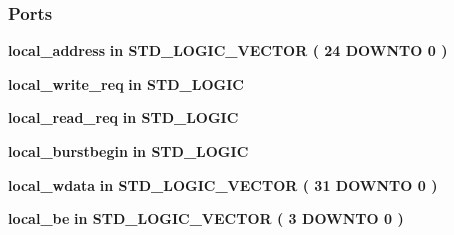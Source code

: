 \subsubsection*{Ports}
 \begin{DoxyCompactItemize}
\item 
{\bf local\+\_\+address}  {\bfseries {\bfseries \textcolor{keywordflow}{in}\textcolor{vhdlchar}{ }}} {\bfseries \textcolor{comment}{S\+T\+D\+\_\+\+L\+O\+G\+I\+C\+\_\+\+V\+E\+C\+T\+OR}\textcolor{vhdlchar}{ }\textcolor{vhdlchar}{(}\textcolor{vhdlchar}{ }\textcolor{vhdlchar}{ } \textcolor{vhdldigit}{24} \textcolor{vhdlchar}{ }\textcolor{keywordflow}{D\+O\+W\+N\+TO}\textcolor{vhdlchar}{ }\textcolor{vhdlchar}{ } \textcolor{vhdldigit}{0} \textcolor{vhdlchar}{ }\textcolor{vhdlchar}{)}\textcolor{vhdlchar}{ }} 
\item 
{\bf local\+\_\+write\+\_\+req}  {\bfseries {\bfseries \textcolor{keywordflow}{in}\textcolor{vhdlchar}{ }}} {\bfseries \textcolor{comment}{S\+T\+D\+\_\+\+L\+O\+G\+IC}\textcolor{vhdlchar}{ }} 
\item 
{\bf local\+\_\+read\+\_\+req}  {\bfseries {\bfseries \textcolor{keywordflow}{in}\textcolor{vhdlchar}{ }}} {\bfseries \textcolor{comment}{S\+T\+D\+\_\+\+L\+O\+G\+IC}\textcolor{vhdlchar}{ }} 
\item 
{\bf local\+\_\+burstbegin}  {\bfseries {\bfseries \textcolor{keywordflow}{in}\textcolor{vhdlchar}{ }}} {\bfseries \textcolor{comment}{S\+T\+D\+\_\+\+L\+O\+G\+IC}\textcolor{vhdlchar}{ }} 
\item 
{\bf local\+\_\+wdata}  {\bfseries {\bfseries \textcolor{keywordflow}{in}\textcolor{vhdlchar}{ }}} {\bfseries \textcolor{comment}{S\+T\+D\+\_\+\+L\+O\+G\+I\+C\+\_\+\+V\+E\+C\+T\+OR}\textcolor{vhdlchar}{ }\textcolor{vhdlchar}{(}\textcolor{vhdlchar}{ }\textcolor{vhdlchar}{ } \textcolor{vhdldigit}{31} \textcolor{vhdlchar}{ }\textcolor{keywordflow}{D\+O\+W\+N\+TO}\textcolor{vhdlchar}{ }\textcolor{vhdlchar}{ } \textcolor{vhdldigit}{0} \textcolor{vhdlchar}{ }\textcolor{vhdlchar}{)}\textcolor{vhdlchar}{ }} 
\item 
{\bf local\+\_\+be}  {\bfseries {\bfseries \textcolor{keywordflow}{in}\textcolor{vhdlchar}{ }}} {\bfseries \textcolor{comment}{S\+T\+D\+\_\+\+L\+O\+G\+I\+C\+\_\+\+V\+E\+C\+T\+OR}\textcolor{vhdlchar}{ }\textcolor{vhdlchar}{(}\textcolor{vhdlchar}{ }\textcolor{vhdlchar}{ } \textcolor{vhdldigit}{3} \textcolor{vhdlchar}{ }\textcolor{keywordflow}{D\+O\+W\+N\+TO}\textcolor{vhdlchar}{ }\textcolor{vhdlchar}{ } \textcolor{vhdldigit}{0} \textcolor{vhdlchar}{ }\textcolor{vhdlchar}{)}\textcolor{vhdlchar}{ }} 

\end{DoxyCompactItemize}
